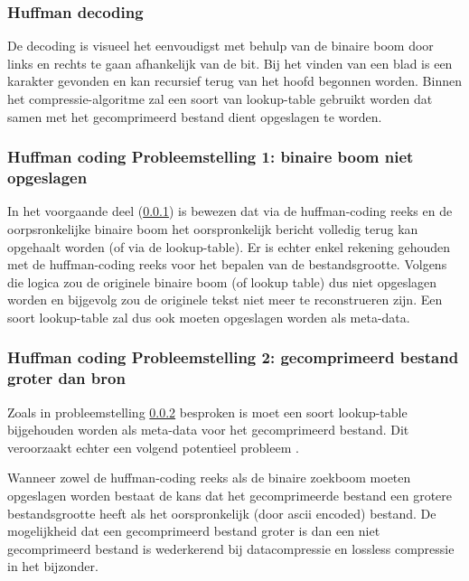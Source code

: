 \subsubsection{Huffman decoding}
\label{sec:primitieve-technieken-voorbeeld-huffman-decoding}
De \gls{decoding} is visueel het eenvoudigst met behulp van de binaire boom door links en rechts te gaan afhankelijk van de bit. Bij het vinden van een blad is een karakter gevonden en kan recursief terug van het hoofd begonnen worden. Binnen het \gls{compressie-algoritme} zal een soort van \gls{lookup-table} gebruikt worden dat samen met het gecomprimeerd bestand dient opgeslagen te worden.

\subsubsection{Huffman coding Probleemstelling 1: binaire boom niet opgeslagen}
\label{sec:primitieve-technieken-voorbeeld-huffman-probleem-1}
In het voorgaande deel (\ref{sec:primitieve-technieken-voorbeeld-huffman-decoding}) is bewezen dat via de \gls{huffman-coding} reeks en de oorpsronkelijke binaire boom het oorspronkelijk bericht volledig terug kan opgehaalt worden (of via de \gls{lookup-table}). Er is echter enkel rekening gehouden met de \gls{huffman-coding} reeks voor het bepalen van de bestandsgrootte. Volgens die logica zou de originele binaire boom (of lookup table) dus niet opgeslagen worden en bijgevolg zou de originele tekst niet meer te reconstrueren zijn. Een soort \gls{lookup-table} zal dus ook moeten opgeslagen worden als \gls{meta-data}.


\subsubsection{Huffman coding Probleemstelling 2: gecomprimeerd bestand groter dan bron}
Zoals in probleemstelling \ref{sec:primitieve-technieken-voorbeeld-huffman-probleem-1} besproken is moet een soort \gls{lookup-table} bijgehouden worden als \gls{meta-data} voor het gecomprimeerd bestand. Dit veroorzaakt echter een volgend potentieel probleem .


Wanneer zowel de \gls{huffman-coding} reeks als de binaire zoekboom moeten opgeslagen worden bestaat de kans dat het gecomprimeerde bestand een grotere bestandsgrootte heeft als het oorspronkelijk (door \gls{ascii} encoded) bestand. De mogelijkheid dat een gecomprimeerd bestand groter is dan een niet gecomprimeerd bestand is wederkerend bij \gls{datacompressie} en \gls{lossless} compressie in het bijzonder.


